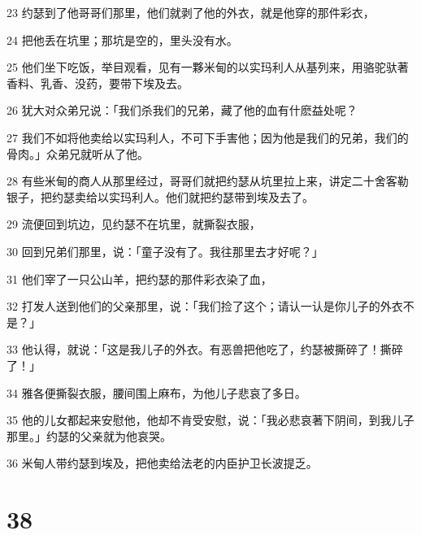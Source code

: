 \par 23 约瑟到了他哥哥们那里，他们就剥了他的外衣，就是他穿的那件彩衣，
\par 24 把他丢在坑里；那坑是空的，里头没有水。
\par 25 他们坐下吃饭，举目观看，见有一夥米甸的以实玛利人从基列来，用骆驼驮著香料、乳香、没药，要带下埃及去。
\par 26 犹大对众弟兄说：「我们杀我们的兄弟，藏了他的血有什麽益处呢？
\par 27 我们不如将他卖给以实玛利人，不可下手害他；因为他是我们的兄弟，我们的骨肉。」众弟兄就听从了他。
\par 28 有些米甸的商人从那里经过，哥哥们就把约瑟从坑里拉上来，讲定二十舍客勒银子，把约瑟卖给以实玛利人。他们就把约瑟带到埃及去了。
\par 29 流便回到坑边，见约瑟不在坑里，就撕裂衣服，
\par 30 回到兄弟们那里，说：「童子没有了。我往那里去才好呢？」
\par 31 他们宰了一只公山羊，把约瑟的那件彩衣染了血，
\par 32 打发人送到他们的父亲那里，说：「我们捡了这个；请认一认是你儿子的外衣不是？」
\par 33 他认得，就说：「这是我儿子的外衣。有恶兽把他吃了，约瑟被撕碎了！撕碎了！」
\par 34 雅各便撕裂衣服，腰间围上麻布，为他儿子悲哀了多日。
\par 35 他的儿女都起来安慰他，他却不肯受安慰，说：「我必悲哀著下阴间，到我儿子那里。」约瑟的父亲就为他哀哭。
\par 36 米甸人带约瑟到埃及，把他卖给法老的内臣护卫长波提乏。

\chapter{38}

